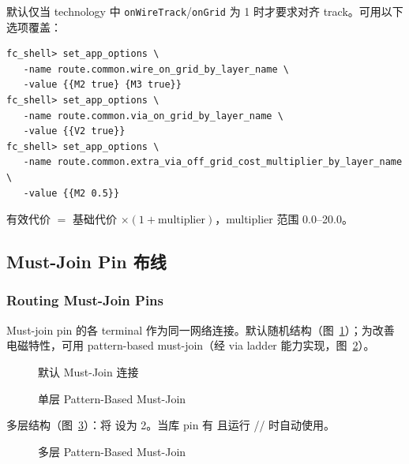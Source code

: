 默认仅当 technology 中 \texttt{onWireTrack}/\texttt{onGrid} 为 1 时才要求对齐 track。可用以下选项覆盖：
\begin{lstlisting}
fc_shell> set_app_options \
   -name route.common.wire_on_grid_by_layer_name \
   -value {{M2 true} {M3 true}}
fc_shell> set_app_options \
   -name route.common.via_on_grid_by_layer_name \
   -value {{V2 true}}
fc_shell> set_app_options \
   -name route.common.extra_via_off_grid_cost_multiplier_by_layer_name \
   -value {{M2 0.5}}
\end{lstlisting}
有效代价 $=$ 基础代价 $\times (1+\mathrm{multiplier})$，multiplier 范围 0.0--20.0。

\subsection{Must-Join Pin 布线}
\subsubsection*{Routing Must-Join Pins}

Must-join pin 的各 terminal 作为同一网络连接。默认随机结构（图~\ref{fig:must-join-default}）；为改善电磁特性，可用 pattern-based must-join（经 via ladder 能力实现，图~\ref{fig:must-join-single}）。

\begin{figure}[htbp]
\centering
{}
\caption{默认 Must-Join 连接}
\label{fig:must-join-default}
\end{figure}

\begin{figure}[htbp]
\centering
{}
\caption{单层 Pattern-Based Must-Join}
\label{fig:must-join-single}
\end{figure}

多层结构（图~\ref{fig:must-join-multi}）：将  设为 2。当库 pin 有  且运行 // 时自动使用。

\begin{figure}[htbp]
\centering
{}
\caption{多层 Pattern-Based Must-Join}
\label{fig:must-join-multi}
\end{figure}

